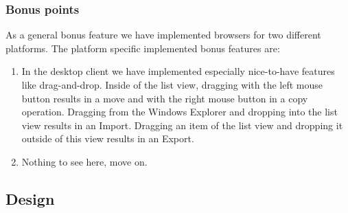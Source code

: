 \documentclass[a4paper,12pt]{article}
\begin{document}
\subsubsection{Bonus points}
As a general bonus feature we have implemented browsers for two different platforms. The platform specific implemented bonus features are:
		\begin{enumerate} [label={(\alph*)}]
		\item In the desktop client we have implemented especially nice-to-have features like drag-and-drop. Inside of the list view, dragging with the left mouse button results in a move and with the right mouse button in a copy operation. Dragging from the Windows Explorer and dropping into the list view results in an Import. Dragging an item of the list view and dropping it outside of this view results in an Export.
		\item Nothing to see here, move on.
		\end{enumerate}

\subsection{Design}
\end{document}
